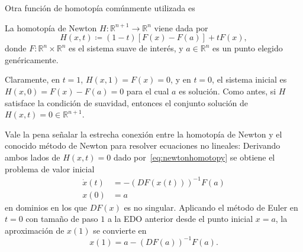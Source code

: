 \begin{frame}
	Otra función de homotopía comúnmente utilizada es
	\begin{definition}
		La \alert{homotopía de Newton}
		$H\colon\mathbb{R}^{n+1}\to\mathbb{R}^{n}$ viene dada
		por
		\begin{equation}\label{eq:newtonhomotopy}
			H\left(x,t\right)\coloneqq
			\left(1-t\right)
			\left[F\left(x\right)-F\left(a\right)\right]+
			tF\left(x\right),
		\end{equation}
		donde
		\begin{math}
			F\colon\mathbb{R}^{n}\times\mathbb{R}^{n}
		\end{math}
		es el sistema suave de interés, y
		$a\in\mathbb{R}^{n}$ es un punto elegido genéricamente.
	\end{definition}
	Claramente, en $t=1$, $H\left(x,1\right)=F\left(x\right)=0$, y en
	$t=0$, el sistema inicial es
	\begin{math}
		H\left(x,0\right)=
		F\left(x\right)-F\left(a\right)=
		0
	\end{math}
	para el cual $a$ es solución.
	Como antes, si $H$ satisface la condición de suavidad, entonces el
	conjunto solución de $H\left(x,t\right)=0\in\mathbb{R}^{n+1}$.

	Vale la pena señalar la estrecha conexión entre la homotopía de
	Newton y el conocido método de Newton para resolver ecuaciones no
	lineales: Derivando ambos lados de $H\left(x,t\right)=0$ dado
	por~\eqref{eq:newtonhomotopy} se obtiene el problema de valor
	inicial
	\begin{align*}
		\dot{x}\left(t\right) & =
		-{\left(DF\left(x\left(t\right)\right)\right)}^{-1}
		F\left(a\right)            \\
		x\left(0\right)       & =a
	\end{align*}
	en dominios en los que $DF\left(x\right)$ es no singular.
	Aplicando el método de Euler en $t=0$ con tamaño de paso $1$ a la
	EDO anterior desde el punto inicial $x=a$, la aproximación de
	$x\left(1\right)$ se convierte en
	\begin{equation*}
		x\left(1\right)=
		a-{\left(DF\left(a\right)\right)}^{-1}F\left(a\right).
	\end{equation*}
\end{frame}

